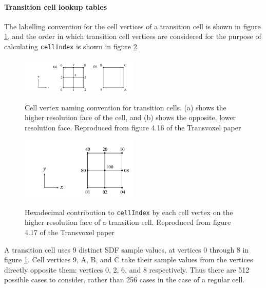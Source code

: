 \documentclass[11pt]{article}
\begin{document}
\paragraph{Transition cell lookup tables}

The labelling convention for the cell vertices of a transition cell is shown in figure \ref{fig:tv_transition_labels}, and the order in which transition cell vertices are considered for the purpose of calculating \texttt{cellIndex} is shown in figure \ref{fig:tv_transition_cellIndex}.

\begin{figure}
  \caption{Cell vertex naming convention for transition cells. (a) shows the higher resolution face of the cell, and (b) shows the opposite, lower resolution face. Reproduced from figure 4.16 of the Transvoxel paper\cite{lengyel_2010}}
  \includegraphics[width=0.5\textwidth]{tv_transition_labels.PNG}
  \label{fig:tv_transition_labels}
\end{figure}

\begin{figure}
  \caption{Hexadecimal contribution to \texttt{cellIndex} by each cell vertex on the higher resolution face of a transition cell. Reproduced from figure 4.17 of the Transvoxel paper\cite{lengyel_2010}}
  \includegraphics[width=0.5\textwidth]{tv_transition_cellIndex.PNG}
  \label{fig:tv_transition_cellIndex}
\end{figure}


A transition cell uses 9 distinct SDF sample values, at vertices 0 through 8 in figure \ref{fig:tv_transition_labels}. Cell vertices 9, A, B, and C take their sample values from the vertices directly opposite them: vertices 0, 2, 6, and 8 respectively. Thus there are 512 possible cases to consider, rather than 256 cases in the case of a regular cell.
\end{document}
